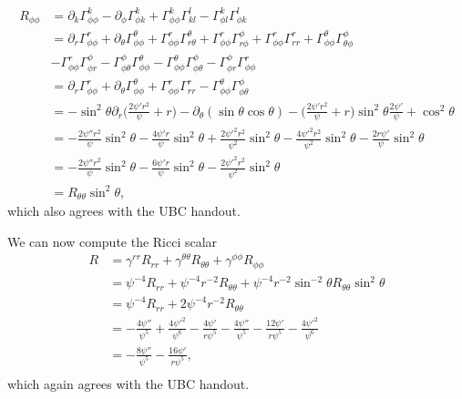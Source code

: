 \documentclass[12pt]{article}
\numberwithin{equation}{section}
\begin{document}
\begin{equation}
\begin{aligned}
R_{\phi \phi} &= \partial_k \Gamma^k_{\phi \phi} - \partial_\phi \Gamma^k_{\phi k} + \Gamma^k_{\phi \phi} \Gamma^l_{kl} - \Gamma^k_{\phi l} \Gamma^l_{\phi k} \\
&= \partial_r \Gamma^r_{\phi \phi} + \partial_\theta \Gamma^\theta_{\phi \phi} + \Gamma^r_{\phi \phi} \Gamma^\theta_{r\theta} + \Gamma^r_{\phi \phi} \Gamma^\phi_{r\phi} + \Gamma^r_{\phi \phi} \Gamma^r_{r r} + \Gamma^\theta_{\phi \phi} \Gamma^\phi_{\theta \phi} \\
&- \Gamma^r_{\phi \phi} \Gamma^\phi_{\phi r} - \Gamma^\phi_{\phi \theta} \Gamma^\theta_{\phi \phi} - \Gamma^\theta_{\phi \phi} \Gamma^\phi_{\phi \theta} - \Gamma^\phi_{\phi r} \Gamma^{r}_{\phi \phi} \\
&= \partial_r \Gamma^r_{\phi \phi} + \partial_\theta \Gamma^\theta_{\phi \phi} + \Gamma^r_{\phi \phi} \Gamma^r_{r r} - \Gamma^\theta_{\phi \phi} \Gamma^\phi_{\phi \theta} \\
&= - \sin^2 \theta \partial_r \Big( \frac{2 \psi' r^2}{\psi} + r \Big) - \partial_\theta (\sin \theta \cos \theta) - \Big( \frac{2 \psi' r^2}{\psi} + r \Big) \sin^2 \theta \frac{2 \psi'}{\psi} + \cos^2 \theta \\
&= - \frac{2 \psi'' r^2}{\psi} \sin^2 \theta - \frac{4 \psi' r}{\psi} \sin^2 \theta + \frac{2 \psi'^2 r^2}{\psi^2} \sin^2 \theta - \frac{4 \psi'^2 r^2}{\psi^2} \sin^2 \theta - \frac{2 r \psi'}{\psi} \sin^2 \theta \\
&= - \frac{2 \psi'' r^2}{\psi} \sin^2 \theta - \frac{6 \psi' r}{\psi} \sin^2 \theta - \frac{2 \psi'^2 r^2}{\psi^2} \sin^2 \theta \\
&= R_{\theta \theta} \sin^2 \theta,
\end{aligned}
\end{equation}
which also agrees with the UBC handout.

We can now compute the Ricci scalar
\begin{equation}
\begin{aligned}
R &= \gamma^{r r} R_{r r} + \gamma^{\theta \theta} R_{\theta \theta} + \gamma^{\phi \phi} R_{\phi \phi} \\
&= \psi^{-4} R_{rr} + \psi^{-4} r^{-2} R_{\theta \theta} + \psi^{-4} r^{-2} \sin^{-2} \theta R_{\theta \theta} \sin^2 \theta \\
&= \psi^{-4} R_{rr} + 2 \psi^{-4} r^{-2} R_{\theta \theta} \\
&= - \frac{4 \psi''}{\psi^5} + \frac{4 \psi'^2}{\psi^6} - \frac{4 \psi'}{r \psi^5} - \frac{4 \psi''}{\psi^5} - \frac{12 \psi'}{r \psi^5} - \frac{4 \psi'^2}{\psi^6} \\
&= - \frac{8 \psi''}{\psi^5} - \frac{16 \psi'}{r \psi^5}, \\
\end{aligned}
\end{equation}
which again agrees with the UBC handout.
\end{document}
